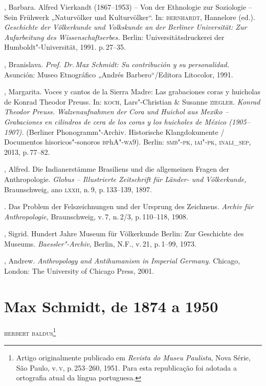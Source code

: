 \begin{bibliohedra}
 , Barbara. Alfred Vierkandt (1867--1953) -- Von der Ethnologie zur
 Soziologie -- Sein Frühwerk „Naturvölker und Kulturvölker``. In:
 \textsc{bernhardt}, Hannelore (ed.). \textit{Geschichte der Völkerkunde und
 Volkskunde an der Berliner Universität: Zur Aufarbeitung des
 Wissenschaftserbes.} Berlin: Universitätsdruckerei der
 Humboldt"-Universität, 1991. p.\,27--35.

 , Branislava. \textit{Prof. Dr.\,Max Schmidt: Su contribución y su
 personalidad.} Asunción: Museo Etnográfico „Andrés Barbero``/Editora
 Litocolor, 1991.

 , Margarita. Voces y cantos de la Sierra Madre: Las
 grabaciones coras y huicholas de Konrad Theodor Preuss. In: \textsc{koch},
 Lars"-Christian \& Susanne \textsc{ziegler}. \textit{Konrad Theodor Preuss.
 Walzenaufnahmen der Cora und Huichol aus Mexiko -- Grabaciones en
 cilindros de cera de los coras y los huicholes de México (1905--1907).}
 (Berliner Phonogramm"-Archiv. Historische Klangdokumente / Documentos
 hisoricos"-sonoros \textsc{bp}h\textsc{A}"-\textsc{wa}9). Berlin: \textsc{smb"-pk, iai"-pk, inali\_sep}, 2013,
 p.\,77--82.

 , Alfred. Die Indianerstämme Brasiliens und die allgemeinen
 Fragen der Anthropologie. \textit{Globus -- Illustrierte Zeitschrift für
 Länder- und Völkerkunde,} Braunschweig, ano \textsc{lxxii}, n.\,9, p.\,133--139,
 1897.

 \titidem. Das Problem der Felszeichnungen und der Ursprung
 des Zeichnens. \textit{Archiv für Anthropologie,} Braunschweig, v.\,7,
 n.\,2/3, p.\,110--118, 1908.

 , Sigrid. Hundert Jahre Museum für Völkerkunde Berlin:
 Zur Geschichte des Museums. \textit{Baessler"-Archiv,} Berlin, N.F., v.\,21, p.\,1--99, 1973.

 , Andrew. \textit{Anthropology and Antihumanism in Imperial
 Germany.} Chicago, London: The University of Chicago Press, 2001.
 \end{bibliohedra}

\chapter*{Max Schmidt, de 1874 a 1950}

\begin{flushright}
\textsc{herbert baldus}\footnote{Artigo originalmente publicado
  em \textit{Revista do Museu Paulista}, Nova Série, São Paulo, v.\,\textsc{v}, p.\,253--260, 1951. Para esta republicação foi adotada a ortografia atual
  da língua portuguesa.}
\end{flushright}

